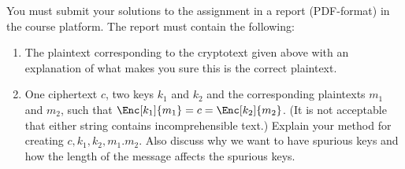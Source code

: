 \documentclass[a4paper]{article}
\begin{document}
You must submit your solutions to the assignment in a report (PDF-format) in 
the course platform.
The report must contain the following:
\begin{enumerate}
  \item The plaintext corresponding to the cryptotext given above with an 
    explanation of what makes you sure this is the correct plaintext.


  \item One ciphertext \(c\), two keys \(k_1\) and \(k_2\) and the 
    corresponding plaintexts \(m_1\) and \(m_2\), such that \(\Enc[k_1]{m_1} 
      = c = \Enc[k_2]{m_2}\).
    (It is not acceptable that either string contains incomprehensible text.)
    Explain your method for creating \(c, k_1, k_2, m_1. m_2\).
    Also discuss why we want to have spurious keys and how the length of the 
    message affects the spurious keys.

\end{enumerate}


\printbibliography{}
\end{document}
